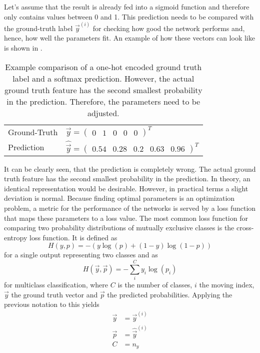Let's assume that the result is already fed into a sigmoid function and therefore only contains values between 0 and 1.
This prediction needs to be compared with the ground-truth label $\vec{y}^{(i)}$ for checking how good the network performs and, hence, how well the parameters fit.
An example of how these vectors can look like is shown in .
\begin{table}[]
	\centering
	\caption[Example comparison of one-hot encoded ground-truth label and prediction]{Example comparison of a one-hot encoded ground truth label and a softmax prediction. However, the actual ground truth feature has the second smallest probability in the prediction. Therefore, the parameters need to be adjusted.}
	\label{tab:prediction}
	\begin{tabular}{ll}
		Ground-Truth & $\vec{y} = \begin{pmatrix} 0 & 1 & 0 & 0 & 0 \end{pmatrix}^T$                     \\
		Prediction   & $\hat{\vec{y}} = \begin{pmatrix} 0.54 & 0.28 & 0.2 & 0.63 & 0.96 \end{pmatrix}^T$
	\end{tabular}
\end{table}
It can be clearly seen, that the prediction is completely wrong.
The actual ground truth feature has the second smallest probability in the prediction.
In theory, an identical representation would be desirable.
However, in practical terms a slight deviation is normal.
Because finding optimal parameters is an optimization problem, a metric for the performance of the networks is served by a loss function that maps these parameters to a loss value.
The most common loss function for comparing two probability distributions of mutually exclusive classes is the cross-entropy loss function.
It is defined as
\begin{equation}
	H(y,p) = -(y \log(p) + (1-y) \log(1-p))
\end{equation}
for a single output representing two classes and as
\begin{equation}
	\label{eq:cross-entropy-loss}
	H(\vec{y}, \vec{p}) = - \sum_{i}^{C} y_i \log (p_i)
\end{equation}
for multiclass classification, where $C$ is the number of classes, $i$ the moving index, $\vec{y}$ the ground truth vector and $\vec{p}$ the predicted probabilities\cite{murphy2013machine}.
Applying the previous notation to this yields
\begin{subequations}
	\begin{align}
		\vec{y} &= \vec{y}^{(i)} \\
		\vec{p} &= \hat{\vec{y}}^{(i)} \\
		C &= n_y
	\end{align}
\end{subequations}

